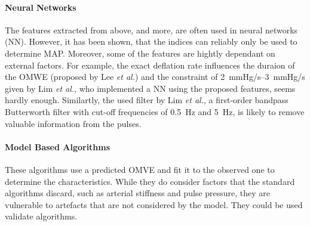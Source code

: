  
\paragraph{Neural Networks} The features extracted from above, and more, are often used in neural networks (NN). However, it has been shown, that the indices can reliably only be used to determine MAP. Moreover, some of the features are hightly dependant on external factors. For example, the exact deflation rate influences the duraion of the OMWE (proposed by Lee \textit{et al.}\cite{Lee2013}) and the constraint of \SIrange{2}{3}{\mmHg/\second} given by Lim \textit{et al.}\cite{Lim2015}, who implemented a NN using the proposed features, seems hardly enough. Similartly, the used filter by Lim \textit{et al.}, a first-order bandpass Butterworth filter with cut-off frequencies of \SI{0.5}{\Hz} and \SI{5}{\Hz}, is likely to remove valuable information from the pulses.

\paragraph{Model Based Algorithms} These algorithms use a predicted OMVE and fit it to the observed one to determine the characteristics. While they do consider factors that the standard algorithms discard, such as arterial stiffness and pulse pressure, they are vulnerable to artefacts that are not considered by the model. They could be used validate algorithms. \cite{Babbs2012}







